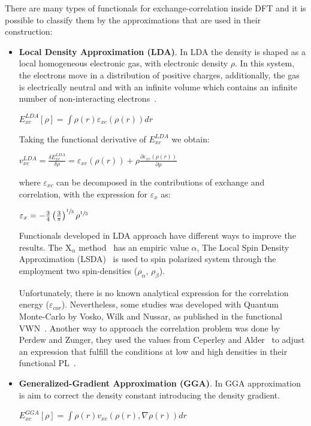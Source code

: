 There are many types of functionals for exchange-correlation inside DFT and it
is possible to classify them by the approximations that are used in their construction:
%
\begin{itemize}
\item \textbf{Local Density Approximation (LDA)}. In LDA the density is shaped as a local homogeneous electronic
gas, with electronic density $\rho$. In this system, the electrons move in a distribution of
positive charges, additionally, the gas is electrically neutral and with an infinite volume
which contains an infinite number of non-interacting electrons~\cite{Koch2001}.

$E_{xc}^{LDA} [\rho] = \int \rho (r) \varepsilon_{xc}(\rho (r)) dr$

Taking the functional derivative of $E_{xc}^{LDA}$ we obtain:

$v_{xc}^{LDA} = \frac{\delta E_{xc}^{LDA}}{\delta\rho} = \varepsilon_{xc}(\rho (r))
+ \rho \frac{\partial \varepsilon_{xc}(\rho (r))}{\partial\rho}$

where $\varepsilon_{xc}$ can be decomposed in the contributions of exchange and correlation,
with the expression for $\varepsilon_{x}$ as:

$\varepsilon_{x} = -\frac34 \left( \frac{3}{\pi} \right)^{\sfrac13}\rho^{\sfrac13}$ 

Functionals developed in LDA approach have different ways to improve the
results. The X$_{\alpha}$ method~\cite{Slater74} has an empiric value $\alpha$,
The Local Spin Density Approximation (LSDA)~\cite{Slater74} is used to spin
polarized system through the employment two spin-densities ($\rho_\alpha$,
$\rho_\beta$).

Unfortunately, there is no known analytical expression for the correlation
energy ($\varepsilon_{cor}$). Nevertheless, some studies was developed with
Quantum Monte-Carlo by Vosko, Wilk and Nussar, as published in the functional
VWN~\cite{Vosko1980}. Another way to approach the correlation problem was done
by Perdew and Zunger, they used the values from Ceperley
and Alder~\cite{Ceperley1980} to adjust an expression that fulfill the
conditions at low and high densities in their functional PL~\cite{Perdew1981}.


\item \textbf{Generalized-Gradient Approximation (GGA)}.
In \gls{GGA}
approximation is aim to correct the density constant introducing the density
gradient.

$E_{xc}^{GGA} [\rho] = \int \rho (r) v_{xc}(\rho (r), \nabla\rho (r)) dr$


\end{itemize}
